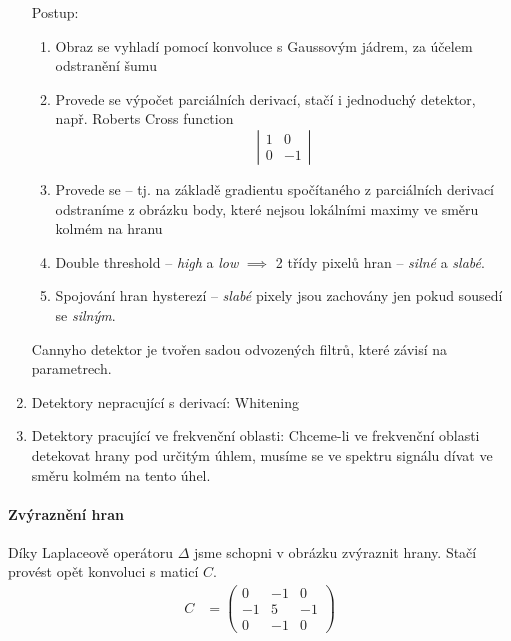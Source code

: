 \begin{enumerate}
Postup:

\begin{enumerate} 
\item Obraz se vyhladí pomocí konvoluce s Gaussovým jádrem, za účelem odstranění šumu
\item Provede se výpočet parciálních derivací, stačí i jednoduchý detektor, např. Roberts Cross function
$$\left|\begin{array}{cc}1&0\\0&-1\end{array}\right|$$
\item Provede se  -- tj. na základě gradientu spočítaného z parciálních derivací odstraníme
z obrázku body, které nejsou lokálními maximy ve směru kolmém na hranu
\item Double threshold -- \emph{high} a \emph{low} $ \implies $ 2 třídy pixelů hran -- \emph{silné} a \emph{slabé}.
\item Spojování hran hysterezí -- \emph{slabé} pixely jsou zachovány jen pokud sousedí se \emph{silným}.
\end{enumerate}

Cannyho detektor je tvořen sadou odvozených filtrů, které závisí na parametrech.

\item Detektory nepracující s derivací: Whitening

\item Detektory pracující ve frekvenční oblasti: Chceme-li ve frekvenční oblasti detekovat hrany pod určitým úhlem, musíme se ve spektru signálu dívat ve směru kolmém na tento úhel.

\end{enumerate}




\paragraph{Zvýraznění hran} 

Díky Laplaceově operátoru $\Delta$ jsme schopni v obrázku zvýraznit hrany. 
Stačí provést opět konvoluci s maticí $C$.
\begin{align}
C &= \left(\begin{array}{ccc}0&-1&0\\-1&5&-1\\0&-1&0\end{array}\right)
\end{align}

